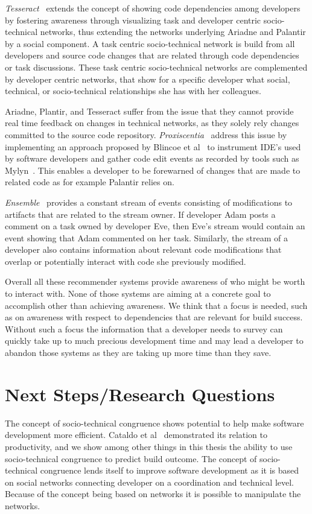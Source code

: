 \emph{Tesseract}~\cite{sarma:icse:2009} extends the concept of showing code dependencies among developers by fostering awareness through visualizing task and developer centric socio-technical networks, thus extending the networks underlying Ariadne and Palantir by a social component.
A task centric socio-technical network is build from all developers and source code changes that are related through code dependencies or task discussions.
These task centric socio-technical networks are complemented by developer centric networks, that show for a specific developer what social, technical, or socio-technical relationships she has with her colleagues.

Ariadne, Plantir, and Tesseract suffer from the issue that they cannot provide real time feedback on changes in  technical networks, as they solely rely changes committed to the source code repository. 
\emph{Proxiscentia}~\cite{borici:chase:2012} address this issue by implementing an approach proposed by Blincoe et al~\cite{blincoe:cscw:2012} to instrument IDE's used by software developers and gather code edit events as recorded by tools such as Mylyn~\cite{kersten:aosd:2005}.
This enables a developer to be forewarned of changes that are made to related code as for example Palantir relies on.

\emph{Ensemble}~\cite{xiang:rsse:2008} provides a constant stream of events consisting of modifications to artifacts that are related to the stream owner.
If developer Adam posts a comment on a task owned by developer Eve, then Eve's stream would contain an event showing that Adam commented on her task.
Similarly, the stream of a developer also contains information about relevant code modifications that overlap or potentially interact with code she previously modified.

Overall all these recommender systems provide awareness of who might be worth to interact with.
None of those systems are aiming at a concrete goal to accomplish other than achieving awareness.
We think that a focus is needed, such as on awareness with respect to dependencies that are relevant for build success.
Without such a focus the information that a developer needs to survey can quickly take up to much precious development time and may lead a developer to abandon those systems as they are taking up more time than they save.


\section{Next Steps/Research Questions}
The concept of socio-technical congruence shows potential to help make software development more efficient.
Cataldo et al~\cite{cataldo:cscw:2006} demonstrated its relation to productivity, and we show among other things in this thesis the ability to use socio-technical congruence to predict build outcome.
The concept of socio-technical congruence lends itself to improve software development as it is based on social networks connecting developer on a coordination and technical level.
Because of the concept being based on networks it is possible to manipulate the networks.

